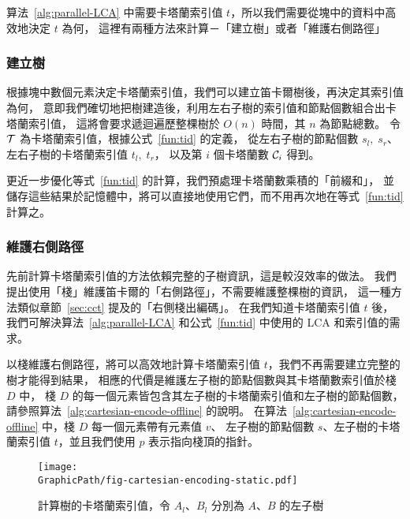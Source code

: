 算法~\ref{alg:parallel-LCA} 中需要卡塔蘭索引值 $t$，所以我們需要從塊中的資料中高效地決定 $t$ 為何，
這裡有兩種方法來計算－「建立樹」或者「維護右側路徑」


\subsubsection{建立樹}

根據塊中數個元素決定卡塔蘭索引值，我們可以建立笛卡爾樹後，再決定其索引值為何，
意即我們確切地把樹建造後，利用左右子樹的索引值和節點個數組合出卡塔蘭索引值，
這將會要求遞迴遍歷整棵樹於 $O(n)$ 時間，其 $n$ 為節點總數。
令 ${\cal T}$ 為卡塔蘭索引值，根據公式~\ref{fun:tid} 的定義，
從左右子樹的節點個數 $s_l, \; s_r$、左右子樹的卡塔蘭索引值 $t_l, \; t_r$，
以及第 $i$ 個卡塔蘭數 ${\cal C}_i$ 得到。



更近一步優化等式~\ref{fun:tid} 的計算，我們預處理卡塔蘭數乘積的「前綴和」，
並儲存這些結果於記憶體中，將可以直接地使用它們，而不用再次地在等式~\ref{fun:tid} 計算之。


\subsubsection{維護右側路徑}

先前計算卡塔蘭索引值的方法依賴完整的子樹資訊，這是較沒效率的做法。
我們提出使用「棧」維護笛卡爾的「右側路徑」，不需要維護整棵樹的資訊，
這一種方法類似章節~\ref{sec:cct} 提及的「右側棧出編碼」。
在我們知道卡塔蘭索引值 $t$ 後，
我們可解決算法~\ref{alg:parallel-LCA} 和公式~\ref{fun:tid} 中使用的 LCA 和索引值的需求。

以棧維護右側路徑，將可以高效地計算卡塔蘭索引值 $t$，我們不再需要建立完整的樹才能得到結果，
相應的代價是維護左子樹的節點個數與其卡塔蘭數索引值於棧 $D$ 中，
棧 $D$ 的每一個元素皆包含其左子樹的卡塔蘭索引值和左子樹的節點個數，
請參照算法~\ref{alg:cartesian-encode-offline} 的說明。
在算法~\ref{alg:cartesian-encode-offline} 中，棧 $D$ 每一個元素帶有元素值 $v$、
左子樹的節點個數 $s$、左子樹的卡塔蘭索引值 $t$，並且我們使用 $p$ 表示指向棧頂的指針。



\begin{figure}[!thb]
  \centering
  \texttt{[image: \\GraphicPath/fig-cartesian-encoding-static.pdf]}
  \caption{計算樹的卡塔蘭索引值，令 $A_l$、$B_l$ 分別為 $A$、$B$ 的左子樹}
  \label{fig:fig-cartesian-encoding-static}
\end{figure}

